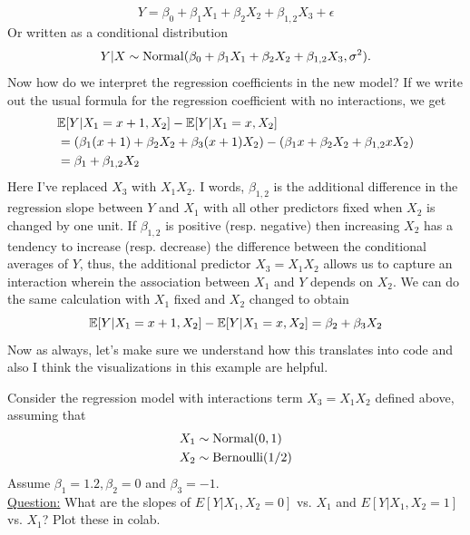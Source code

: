 \begin{equation*}
Y = \beta_0 + \beta_1 X_1 + \beta_2 X_2 + \beta_{1,2}X_3 + \epsilon
\end{equation*} 
Or written as a conditional distribution 
\begin{equation*}
Y|X \sim {\rm Normal}( \beta_0 + \beta_1 X_1 + \beta_2 X_2 + \beta_{1,2} X_3, \sigma^2). 
\end{equation*} 
 Now how do we interpret the regression coefficients in the new model? 
If we write out the usual formula for the regression coefficient with no interactions, we get 
\begin{align*}
 &\mathbb E[Y|X_1 = x+1,X_2] -\mathbb E[Y|X_1 = x,X_2]\\
 &  =  \left(\beta_1 (x+1)+ \beta_2 X_2 + \beta_3 (x+1)X_2\right)- \left(\beta_1 x + \beta_2 X_2 + \beta_{1,2} x X_2\right)\\
 &= \beta_1 + \beta_{1,2}X_2
\end{align*}
Here I've replaced $X_3$ with $X_1X_2$. I words, $\beta_{1,2}$ is the additional difference in the regression slope between $Y$ and $X_1$ with all other predictors fixed when $X_2$ is changed by one unit. 
If $\beta_{1,2}$ is positive (resp. negative) then increasing $X_2$ has a tendency to increase (resp. decrease) the difference between the conditional averages of $Y$, thus, the additional predictor $X_3 = X_1X_2$ allows us to capture an interaction wherein the association between $X_1$ and $Y$ depends on $X_2$. We can do the same calculation with $X_1$ fixed and $X_2$ changed to obtain 
\begin{equation*}
 \mathbb E[Y|X_1 = x+1,X_2] - \mathbb E[Y|X_1 = x,X_2] = \beta_2 + \beta_3X_2
\end{equation*}
Now as always, let's make sure we understand how this translates into code and also I think the visualizations in this example are helpful. 


\begin{example}
Consider the regression model with interactions term $X_3 = X_1X_2$ defined above, assuming that 
\begin{align*}
X_1 &\sim {\rm Normal}(0,1)\\
X_2 &\sim {\rm Bernoulli}(1/2)
\end{align*}
Assume $\beta_1 = 1.2,\beta_2 = 0$ and $\beta_3 =-1$. \\


\noindent
\underline{Question:} What are the slopes of $E[Y|X_1,X_2=0]$ vs. $X_1$ and $E[Y|X_1,X_2=1]$ vs. $X_1$? Plot these in colab. 


\end{example}

